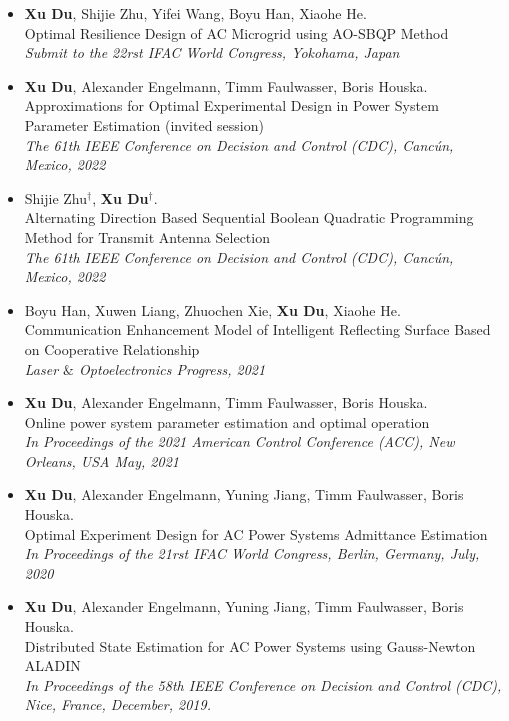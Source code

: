 \documentclass[paper=a4,fontsize=11pt]{scrartcl} %
\begin{document}
\begin{itemize}
	\item  { \textbf{Xu Du}, Shijie Zhu, Yifei Wang, Boyu Han, Xiaohe He. \\
		{Optimal Resilience Design of AC Microgrid
			using AO-SBQP Method}\\
		\emph{ Submit to the 22rst IFAC World Congress, Yokohama, Japan
	} }
	
		\item  { \textbf{Xu Du}, Alexander Engelmann, Timm Faulwasser, Boris Houska. \\
		{Approximations for Optimal Experimental Design
			in Power System Parameter Estimation (invited session)}\\
		\emph{ The 61th IEEE Conference on Decision and Control (CDC), Canc\'un, Mexico, 2022
		} }
	
	
	\item  { Shijie Zhu$^{\dag}$, \textbf{Xu Du}$^{\dag}$. \\
		{Alternating Direction Based Sequential Boolean Quadratic Programming Method for Transmit Antenna Selection}\\
		\emph{ The 61th IEEE Conference on Decision and Control (CDC), Canc\'un, Mexico, 2022
	} }
	
		\item  { Boyu Han, Xuwen Liang, Zhuochen Xie, \textbf{Xu Du}, Xiaohe He. \\
		{Communication Enhancement Model of Intelligent Reflecting Surface Based on Cooperative Relationship}\\
		\emph{Laser $\&$ Optoelectronics Progress, 2021
	} }
	
	\item  { \textbf{Xu Du}, Alexander Engelmann, Timm Faulwasser, Boris Houska. \\
		{Online power system parameter estimation and optimal operation}\\
		\emph{In Proceedings of the 2021 American Control Conference (ACC), New Orleans, USA May, 2021
	} }
	
		\item  {\textbf{Xu Du}, Alexander Engelmann, Yuning Jiang, Timm Faulwasser, Boris Houska. \\
		Optimal Experiment Design for AC Power Systems Admittance Estimation\\
		\emph{In Proceedings of the 21rst IFAC World Congress, Berlin, Germany, July, 2020
		} }
	
	\item  {\textbf{Xu Du}, Alexander Engelmann, Yuning Jiang, Timm Faulwasser, Boris Houska. \\
		Distributed State Estimation for AC Power Systems using Gauss-Newton ALADIN \\
		 \emph{In Proceedings of the 58th IEEE Conference on Decision and Control (CDC),
		Nice, France, December, 2019.} }
\end{itemize}
\end{document}
